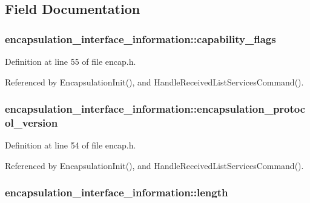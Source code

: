 \subsection{\-Field \-Documentation}
\hypertarget{structencapsulation__interface__information_a4b05e4dd9594531622245c89b28833a0}{
\subsubsection[{capability\-\_\-flags}]{ {\bf encapsulation\-\_\-interface\-\_\-information\-::capability\-\_\-flags}}}\label{d0/d6e/structencapsulation__interface__information_a4b05e4dd9594531622245c89b28833a0}


\-Definition at line 55 of file encap.\-h.



\-Referenced by \-Encapsulation\-Init(), and \-Handle\-Received\-List\-Services\-Command().

\hypertarget{structencapsulation__interface__information_a8c202a5bccd134008359a0d9549bd072}{
\subsubsection[{encapsulation\-\_\-protocol\-\_\-version}]{ {\bf encapsulation\-\_\-interface\-\_\-information\-::encapsulation\-\_\-protocol\-\_\-version}}}\label{d0/d6e/structencapsulation__interface__information_a8c202a5bccd134008359a0d9549bd072}


\-Definition at line 54 of file encap.\-h.



\-Referenced by \-Encapsulation\-Init(), and \-Handle\-Received\-List\-Services\-Command().

\hypertarget{structencapsulation__interface__information_a8fb3a6cdadccfbb2abfc364afd444370}{
\subsubsection[{length}]{ {\bf encapsulation\-\_\-interface\-\_\-information\-::length}}}\label{d0/d6e/structencapsulation__interface__information_a8fb3a6cdadccfbb2abfc364afd444370}


